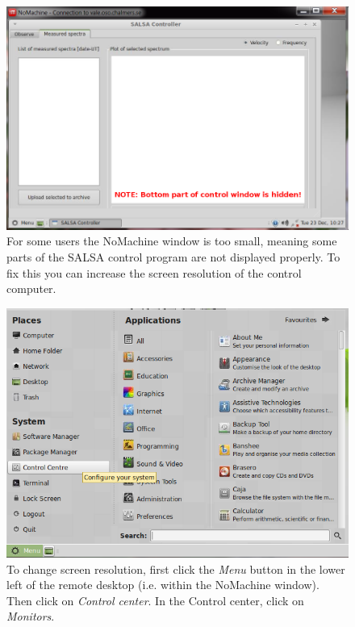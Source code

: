 \begin{figure}[H]
    \centering
    \includegraphics[height=0.3\paperheight]{../figures/nomachinefigs/fig9_toosmallwin.png}
    \caption{For some users the NoMachine window is too small, meaning some parts of
	the SALSA control program are not displayed properly. To fix this you
can increase the screen resolution of the control computer. }
    \label{fig:toosmall}
\end{figure}

\begin{figure}[H]
    \centering
    \includegraphics[height=0.3\paperheight]{../figures/nomachinefigs/fig10_menu.png}
	\caption{To change screen resolution, first click the \emph{Menu} button in
		the lower left of the remote desktop (i.e. within the NoMachine window).
	    Then click on \emph{Control center}. In the Control center, click on \emph{Monitors}.}
    \label{fig:controlcenter}
\end{figure}

